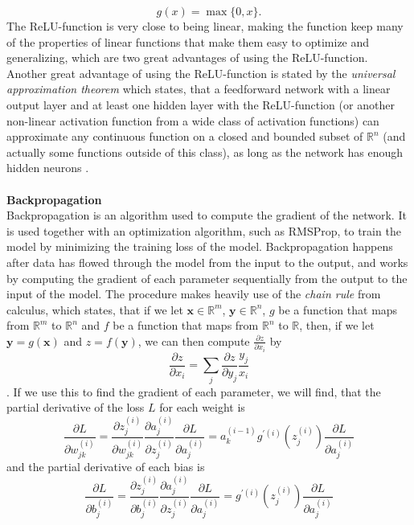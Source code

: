 \documentclass[./main.tex]{subfiles}
\begin{document}
$$g(x) = \max\{0, x\}.$$
The ReLU-function is very close to being linear, making the function keep many of the properties of linear functions that make them easy to optimize and generalizing, which are two great advantages of using the ReLU-function. Another great advantage of using the ReLU-function is stated by the \textit{universal approximation theorem} which states, that a feedforward network with a linear output layer and at least one hidden layer with the ReLU-function (or another non-linear activation function from a wide class of activation functions) can approximate any continuous function on a closed and bounded subset of $\mathbb{R}^n$ (and actually some functions outside of this class), as long as the network has enough hidden neurons \cite{DeepLearning}. 
\\
\\
\noindent \textbf{Backpropagation} \\
Backpropagation is an algorithm used to compute the gradient of the network. It is used together with an optimization algorithm, such as RMSProp, to train the model by minimizing the training loss of the model. Backpropagation happens after data has flowed through the model from the input to the output, and works by computing the gradient of each parameter sequentially from the output to the input of the model. The procedure makes heavily use of the \textit{chain rule} from calculus, which states, that if we let $\bm{x} \in \mathbb{R}^m$, $\bm{y} \in \mathbb{R}^n$, $g$ be a function that maps from $\mathbb{R}^m$ to $\mathbb{R}^n$ and $f$ be a function that maps from $\mathbb{R}^n$ to $\mathbb{R}$, then, if we let $\bm{y} = g(\bm{x})$ and $z = f(\bm{y})$, we can then compute $\frac{\partial z}{\partial x_i}$ by
$$\frac{\partial z}{\partial x_i} = \sum_j \frac{\partial z}{\partial y_j} \frac{y_j}{x_i}$$
\cite{DeepLearning}. If we use this to find the gradient of each parameter, we will find, that the partial derivative of the loss $L$ for each weight is
$$\frac{\partial L}{\partial w_{jk} ^{(i)}} = \frac{\partial z_j ^{(i)}}{\partial w_{jk} ^{(i)}} \frac{\partial a_j ^{(i)}}{\partial z_j ^{(i)}} \frac{\partial L}{\partial a_j ^{(i)}} = a_k ^{(i - 1)} g ^{\prime (i)} \left( z_j ^{(i)} \right) \frac{\partial L}{\partial a_j ^{(i)}}$$
and the partial derivative of each bias is
$$\frac{\partial L}{\partial b^{(i)} _j} = \frac{\partial z^{(i)} _j}{\partial b^{(i)} _j} \frac{\partial a_j ^{(i)}}{\partial z^{(i)} _j} \frac{\partial L}{\partial a_j ^{(i)}} = g^{\prime (i)} \left( z_j ^{(i)} \right) \frac{\partial L}{\partial a_j ^{(i)}}$$
\end{document}
